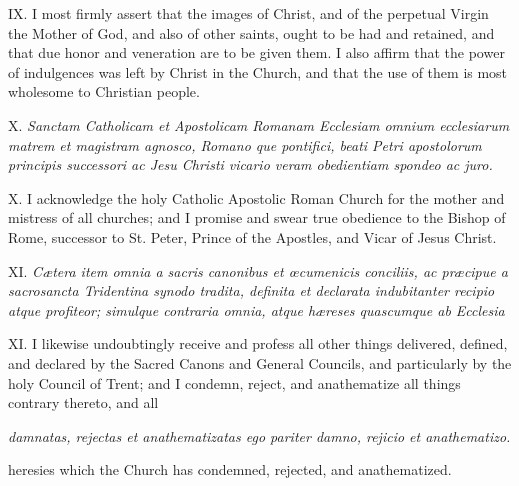 IX. I most firmly assert that the images of Christ, and of the perpetual Virgin the Mother of God, and also of other saints, ought to be had and retained, and that due honor and veneration are to be given them. I also affirm that the power of indulgences was left by Christ in the Church, and that the use of them is most wholesome to Christian people.

X. \emph{Sanctam Catholicam et Apostolicam Romanam Ecclesiam omnium ecclesiarum matrem et magistram agnosco, Romano que pontifici, beati Petri apostolorum principis successori ac Jesu Christi vicario veram obedientiam spondeo ac juro.}

X. I acknowledge the holy Catholic Apostolic Roman Church for the mother and mistress of all churches; and I promise and swear true obedience to the Bishop of Rome, successor to St. Peter, Prince of the Apostles, and Vicar of Jesus Christ.

XI. \emph{Cætera item omnia a sacris canonibus et œcumenicis conciliis, ac præcipue a sacrosancta Tridentina synodo tradita, definita et declarata indubitanter recipio atque profiteor; simulque contraria omnia, atque hæreses quascumque ab Ecclesia }

XI. I likewise undoubtingly receive and profess all other things delivered, defined, and declared by the Sacred Canons and General Councils, and particularly by the holy Council of Trent; and I condemn, reject, and anathematize all things contrary thereto, and all

\emph{damnatas, rejectas et anathematizatas ego pariter damno, rejicio et anathematizo.}

heresies which the Church has condemned, rejected, and anathematized.

